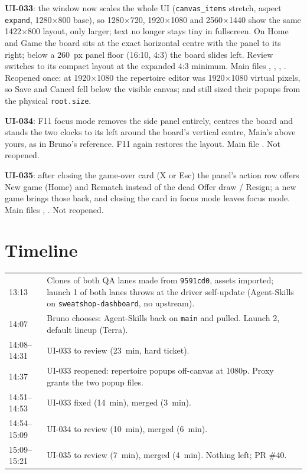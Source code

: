 \documentclass[11pt,a4paper]{article}
\begin{document}
\textbf{UI-033}: the window now scales the whole UI (\texttt{canvas\_items} stretch, aspect
\texttt{expand}, 1280$\times$800 base), so 1280$\times$720, 1920$\times$1080 and 2560$\times$1440
show the same 1422$\times$800 layout, only larger; text no longer stays tiny in fullscreen. On Home
and Game the board sits at the exact horizontal centre with the panel to its right; below a 260~px
panel floor (16:10, 4:3) the board slides left. Review switches to its compact layout at the
expanded 4:3 minimum. Main files , , ,
. Reopened once: at 1920$\times$1080 the repertoire editor was 1920$\times$1080
virtual pixels, so Save and Cancel fell below the visible canvas;  and
 still sized their popups from the physical \texttt{root.size}.

\textbf{UI-034}: F11 focus mode removes the side panel entirely, centres the board and stands the two
clocks to its left around the board's vertical centre, Maia's above yours, as in Bruno's reference.
F11 again restores the layout. Main file . Not reopened.

\textbf{UI-035}: after closing the game-over card (X or Esc) the panel's action row offers New game
(Home) and Rematch instead of the dead Offer draw / Resign; a new game brings those back, and
closing the card in focus mode leaves focus mode. Main files ,
. Not reopened.

\section*{Timeline}

{\small
\begin{tabularx}{\linewidth}{@{}lX@{}}
\toprule
13:13 & Clones of both QA lanes made from \texttt{9591cd0}, assets imported; launch 1 of both lanes throws at the driver self-update (Agent-Skills on \texttt{sweatshop-dashboard}, no upstream). \\
14:07 & Bruno chooses: Agent-Skills back on \texttt{main} and pulled. Launch 2, default lineup (Terra). \\
14:08--14:31 & UI-033 to review (23~min, hard ticket). \\
14:37 & UI-033 reopened: repertoire popups off-canvas at 1080p. Proxy grants the two popup files. \\
14:51--14:53 & UI-033 fixed (14~min), merged (3~min). \\
14:54--15:09 & UI-034 to review (10~min), merged (6~min). \\
15:09--15:21 & UI-035 to review (7~min), merged (4~min). Nothing left; PR \#40. \\
\bottomrule
\end{tabularx}
}
\end{document}
